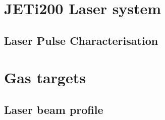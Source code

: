 \section{JETi200 Laser system}
\subsection{Laser Pulse Characterisation}
\section{Gas targets}
\subsection{Laser beam profile}

